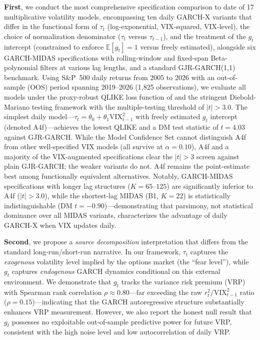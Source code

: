\documentclass[12pt,a4paper]{article}
\newcommand{\E}{\mathbb{E}}
\begin{document}
\textbf{First}, we conduct the most comprehensive specification comparison to date of 17 multiplicative volatility models, encompassing ten daily GARCH-X variants that differ in the functional form of $\tau_t$ (log-exponential, VIX-squared, VIX-level), the choice of normalization denominator ($\tau_t$ versus $\tau_{t-1}$), and the treatment of the $g_t$ intercept (constrained to enforce $\E[g_t]=1$ versus freely estimated), alongside six GARCH-MIDAS specifications with rolling-window and fixed-span Beta-polynomial filters at various lag lengths, and a standard GJR-GARCH(1,1) benchmark. Using S\&P~500 daily returns from 2005 to 2026 with an out-of-sample (OOS) period spanning 2019--2026 (1,825 observations), we evaluate all models under the proxy-robust QLIKE loss function of \citet{patton2011} and the stringent Diebold-Mariano testing framework with the \citet{harvey2016} multiple-testing threshold of $|t| > 3.0$. The simplest daily model---$\tau_t = \theta_0 + \theta_1 \mathrm{VIX}_{t-1}^2$ with freely estimated $g_t$ intercept (denoted A4f)---achieves the lowest QLIKE and a DM test statistic of $t = 4.03$ against GJR-GARCH. While the Model Confidence Set cannot distinguish A4f from other well-specified VIX models (all survive at $\alpha = 0.10$), A4f and a majority of the VIX-augmented specifications clear the $|t|>3$ screen against plain GJR-GARCH; the weaker variants do not. A4f remains the point-estimate best among functionally equivalent alternatives. Notably, GARCH-MIDAS specifications with longer lag structures ($K = 65$--$125$) are significantly inferior to A4f ($|t| > 3.0$), while the shortest-lag MIDAS (B1, $K=22$) is statistically indistinguishable (DM $t = -0.90$)---demonstrating that parsimony, not statistical dominance over all MIDAS variants, characterizes the advantage of daily GARCH-X when VIX updates daily.

\textbf{Second}, we propose a \emph{source decomposition} interpretation that differs from the standard long-run/short-run narrative. In our framework, $\tau_t$ captures the \emph{exogenous} volatility level implied by the options market (the ``fear level''), while $g_t$ captures \emph{endogenous} GARCH dynamics conditional on this external environment. We demonstrate that $g_t$ tracks the variance risk premium (VRP) with Spearman rank correlation $\rho \approx 0.80$---far exceeding the raw $r_t^2 / \mathrm{VIX}_{t-1}^2$ ratio ($\rho = 0.15$)---indicating that the GARCH autoregressive structure substantially enhances VRP measurement. However, we also report the honest null result that $g_t$ possesses no exploitable out-of-sample predictive power for future VRP, consistent with the high noise level and low autocorrelation of daily VRP.
\end{document}
